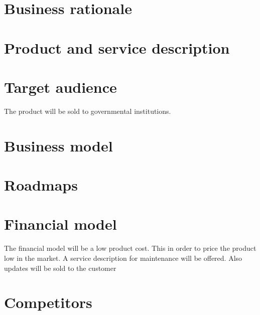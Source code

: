 \section{Business rationale}

\section{Product and service description}

\section{Target audience}
The product will be sold to governmental institutions.

\section{Business model}

\section{Roadmaps}

\section{Financial model}
The financial model will be a low product cost. This in order to price the product low in the market. A service description for maintenance will be offered. Also updates will be sold to the customer

\section{Competitors}



